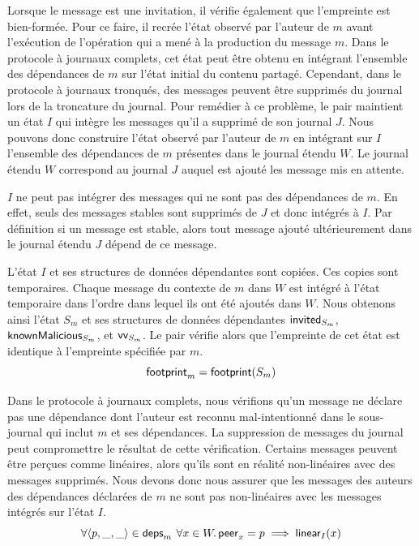 
Lorsque le message est une invitation, il vérifie également que l'empreinte est bien-formée.
Pour ce faire, il recrée l'état observé par l'auteur de $m$ avant l'exécution de l'opération qui a mené à la production du message $m$.
Dans le protocole à journaux complets, cet état peut être obtenu en intégrant l'ensemble des dépendances de $m$ sur l'état initial du contenu partagé.
Cependant, dans le protocole à journaux tronqués, des messages peuvent être supprimés du journal lors de la troncature du journal.
Pour remédier à ce problème, le pair maintient un état $I$ qui intègre les messages qu'il a supprimé de son journal $J$.
Nous pouvons donc construire l'état observé par l'auteur de $m$ en intégrant sur $I$ l'ensemble des dépendances de $m$ présentes dans le journal étendu $W$.
Le journal étendu $W$ correspond au journal $J$ auquel est ajouté les message mis en attente.

\begin{remark}
$I$ ne peut pas intégrer des messages qui ne sont pas des dépendances de $m$.
En effet, seuls des messages stables sont supprimés de $J$ et donc intégrés à $I$.
Par définition si un message est stable, alors tout message ajouté ultérieurement dans le journal étendu $J$ dépend de ce message.
\end{remark}

L'état $I$ et ses structures de données dépendantes sont copiées.
Ces copies sont temporaires.
Chaque message du contexte de $m$ dans $W$ est intégré à l'état temporaire dans l'ordre dans lequel ils ont été ajoutés dans $W$.
Nous obtenons ainsi l'état $S_m$ et ses structures de données dépendantes $\operatorname{\mathsf{invited}}_{S_m}$, $\operatorname{\mathsf{knownMalicious}}_{S_m}$, et $\operatorname{\mathsf{vv}}_{S_m}$.
Le pair vérifie alors que l'empreinte de cet état est identique à l'empreinte spécifiée par $m$.
%
\begin{equation}
    \operatorname{\mathsf{footprint}}_m = \operatorname{\mathsf{footprint}}(S_m)
\end{equation}

Dans le protocole à journaux complets, nous vérifions qu'un message ne déclare pas une dépendance dont l'auteur est reconnu mal-intentionné dans le sous-journal qui inclut $m$ et ses dépendances.
La suppression de messages du journal peut compromettre le résultat de cette vérification.
Certains messages peuvent être perçues comme linéaires, alors qu'ils sont en réalité non-linéaires avec des messages supprimés.
Nous devons donc nous assurer que les messages des auteurs des dépendances déclarées de $m$ ne sont pas non-linéaires avec les messages intégrés sur l'état $I$.
%
\begin{equation}\label{eq:non-linear-I-verif}
    \forall \tuple*{p, \_, \_} \in \trm{deps}_m \:\forall x \in W \qsep \trm{peer}_x = p \implies \trm{linear}_I(x)
\end{equation}


